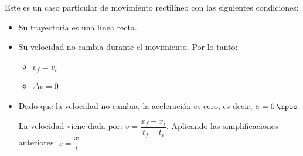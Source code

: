 Este es un caso particular de movimiento rectilíneo con las siguientes condiciones:
\begin{itemize}
    \item Su trayectoria es una línea recta.
    \item Su velocidad no cambia durante el movimiento. Por lo tanto:
    \begin{itemize}
        \item \( v_f = v_i \)
        \item \( \Delta v = 0 \)
    \end{itemize}
    \item Dado que la velocidad no cambia, la aceleración es cero, es decir, \( a = \qty{0}{\mpss} \)

    \begin{theorem}[]
        La velocidad viene dada por: $v = \dfrac{x_f - x_i}{t_f-t_i}$. Aplicando las simplificaciones anteriores: \(  v = \dfrac{x}{t}  \)

    \end{theorem}
\end{itemize}



